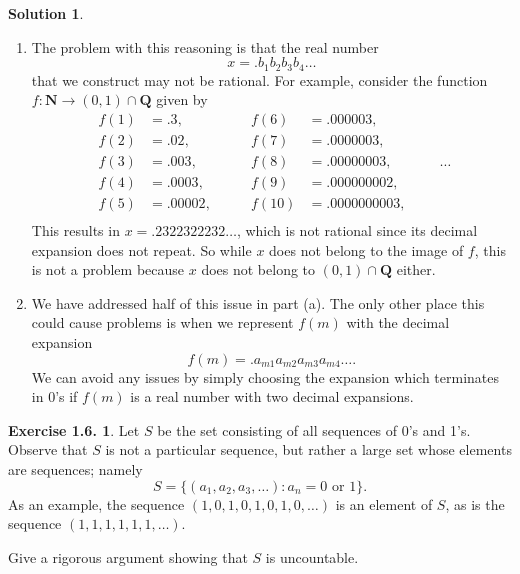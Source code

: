 \documentclass[12pt]{article}
\theoremstyle{definition}
\theoremstyle{exercise}
\newtheorem{exercise}{Exercise 1.6.}
\theoremstyle{solution}
\newtheorem*{solution}{Solution}
\newcommand{\N}{\mathbf{N}}
\newcommand{\Q}{\mathbf{Q}}
\begin{document}
\begin{solution}
    \begin{enumerate}
        \item The problem with this reasoning is that the real number
        \[
            x = .b_1 b_2 b_3 b_4 \ldots
        \]
        that we construct may not be rational. For example, consider the function \( f : \N \to (0, 1) \cap \Q \) given by
        \[
        \begin{aligned}
            f(1) &= .3, \\
            f(2) &= .02, \\
            f(3) &= .003, \\
            f(4) &= .0003, \\
            f(5) &= .00002, \\
        \end{aligned}
        \qquad
        \begin{aligned}
            f(6) &= .000003, \\
            f(7) &= .0000003, \\
            f(8) &= .00000003, \\
            f(9) &= .000000002, \\
            f(10) &= .0000000003, \\
        \end{aligned}
        \qquad \cdots
        \]
        This results in \( x = .2322322232 \ldots \), which is not rational since its decimal expansion does not repeat. So while \( x \) does not belong to the image of \( f \), this is not a problem because \( x \) does not belong to \( (0, 1) \cap \Q \) either.

        \item We have addressed half of this issue in  part (a). The only other place this could cause problems is when we represent \( f(m) \) with the decimal expansion
        \[
            f(m) = . a_{m1} a_{m2} a_{m3} a_{m4} \ldots.
        \]
        We can avoid any issues by simply choosing the expansion which terminates in 0's if \( f(m) \) is a real number with two decimal expansions.
    \end{enumerate}
\end{solution}

\begin{exercise}
\label{ex:4}
    Let \( S \) be the set consisting of all sequences of 0's and 1's. Observe that \( S \) is not a particular sequence, but rather a large set whose elements are sequences; namely
    \[
        S = \{ (a_1, a_2, a_3, \ldots) : a_n = 0 \text{ or } 1 \}.
    \]
    As an example, the sequence \( (1, 0, 1, 0, 1, 0, 1, 0, \ldots) \) is an element of \( S \), as is the sequence \( (1, 1, 1, 1, 1, 1, \ldots) \).

    Give a rigorous argument showing that \( S \) is uncountable.
\end{exercise}
\end{document}
